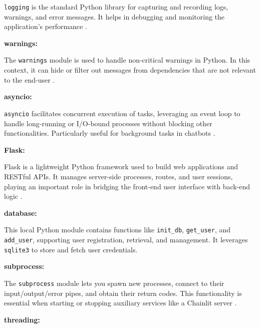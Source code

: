 \noindent
\texttt{logging} is the standard Python library for capturing and recording logs, warnings, and error messages. 
It helps in debugging and monitoring the application’s performance \cite{logging}.

\vspace{0.4cm}
\noindent\textbf{warnings:}

\noindent
The \texttt{warnings} module is used to handle non-critical warnings in Python. In this context, it can hide or filter 
out messages from dependencies that are not relevant to the end-user \cite{warnings}.

\vspace{0.4cm}
\noindent\textbf{asyncio:}

\noindent
\texttt{asyncio} facilitates concurrent execution of tasks, leveraging an event loop to handle long-running or 
I/O-bound processes without blocking other functionalities. Particularly useful for background tasks in chatbots \cite{pythonlibrary}.

\vspace{0.4cm}
\noindent\textbf{Flask:}

\noindent
Flask is a lightweight Python framework used to build web applications and RESTful APIs. 
It manages server-side processes, routes, and user sessions, playing an important role in bridging
the front-end user interface with back-end logic \cite{flask}.

\vspace{0.4cm}
\noindent\textbf{database:}

\noindent
This local Python module contains functions like \texttt{init\_db}, \texttt{get\_user}, and \texttt{add\_user}, 
supporting user registration, retrieval, and management. It leverages \texttt{sqlite3} to store and fetch user credentials.

\vspace{0.4cm}
\noindent\textbf{subprocess:}

\noindent
The \texttt{subprocess} module lets you spawn new processes, connect to their input/output/error pipes,
and obtain their return codes. This functionality is essential when starting or stopping auxiliary services 
like a Chainlit server \cite{subprocess}.

\vspace{0.4cm}
\noindent\textbf{threading:}

